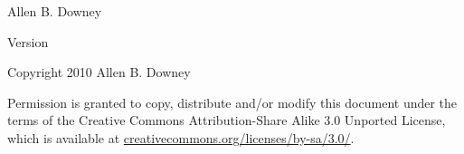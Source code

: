 \begin{htmlonly}


{\Large \thetitle}

{\large Allen B. Downey}

Version \theversion

\setcounter{chapter}{-1}

Copyright 2010 Allen B. Downey

\vspace{0.25in}

Permission is granted to copy, distribute and/or modify this document
under the terms of the Creative Commons Attribution-Share Alike 3.0
Unported License, which is available at
\url{creativecommons.org/licenses/by-sa/3.0/}.

\end{htmlonly}
